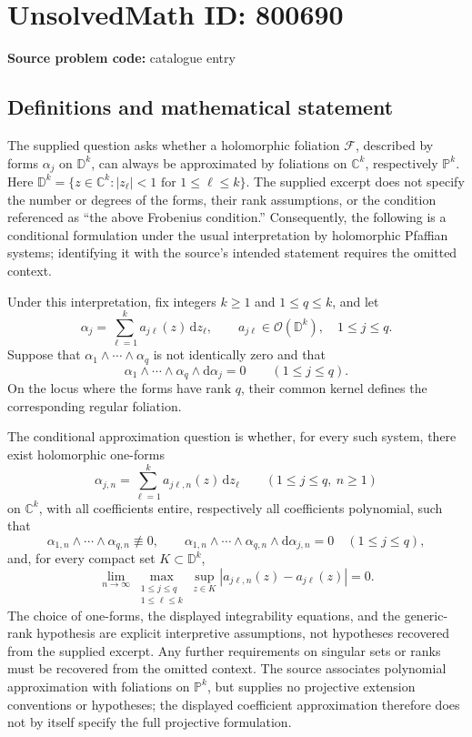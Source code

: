 \documentclass[11pt]{article}
\newcommand{\C}{\mathbb{C}}
\newcommand{\PP}{\mathbb{P}}
\begin{document}
\section*{UnsolvedMath ID: 800690}
\textbf{Source problem code:} catalogue entry
\subsection{Definitions and mathematical statement}
The supplied question asks whether a holomorphic foliation \(\mathscr{F}\), described by forms \(\alpha_j\) on \(\mathbb{D}^k\), can always be approximated by foliations on \(\C^k\), respectively \(\PP^k\). Here \(\mathbb{D}^k=\{z\in\C^k:|z_\ell|<1\text{ for }1\leq\ell\leq k\}\). The supplied excerpt does not specify the number or degrees of the forms, their rank assumptions, or the condition referenced as ``the above Frobenius condition.'' Consequently, the following is a conditional formulation under the usual interpretation by holomorphic Pfaffian systems; identifying it with the source's intended statement requires the omitted context.

Under this interpretation, fix integers \(k\geq1\) and \(1\leq q\leq k\), and let
\[
\alpha_j=\sum_{\ell=1}^k a_{j\ell}(z)\,\mathrm{d}z_\ell,
\qquad a_{j\ell}\in\mathcal{O}(\mathbb{D}^k),\quad 1\leq j\leq q.
\]
Suppose that \(\alpha_1\wedge\cdots\wedge\alpha_q\) is not identically zero and that
\[
\alpha_1\wedge\cdots\wedge\alpha_q\wedge\mathrm{d}\alpha_j=0
\qquad(1\leq j\leq q).
\]
On the locus where the forms have rank \(q\), their common kernel defines the corresponding regular foliation.

The conditional approximation question is whether, for every such system, there exist holomorphic one-forms
\[
\alpha_{j,n}=\sum_{\ell=1}^k a_{j\ell,n}(z)\,\mathrm{d}z_\ell
\qquad(1\leq j\leq q,\ n\geq1)
\]
on \(\C^k\), with all coefficients entire, respectively all coefficients polynomial, such that
\[
\alpha_{1,n}\wedge\cdots\wedge\alpha_{q,n}\not\equiv0,
\qquad
\alpha_{1,n}\wedge\cdots\wedge\alpha_{q,n}\wedge\mathrm{d}\alpha_{j,n}=0
\quad(1\leq j\leq q),
\]
and, for every compact set \(K\subset\mathbb{D}^k\),
\[
\lim_{n\to\infty}\max_{\substack{1\leq j\leq q\\1\leq\ell\leq k}}
\sup_{z\in K}|a_{j\ell,n}(z)-a_{j\ell}(z)|=0.
\]
The choice of one-forms, the displayed integrability equations, and the generic-rank hypothesis are explicit interpretive assumptions, not hypotheses recovered from the supplied excerpt. Any further requirements on singular sets or ranks must be recovered from the omitted context. The source associates polynomial approximation with foliations on \(\PP^k\), but supplies no projective extension conventions or hypotheses; the displayed coefficient approximation therefore does not by itself specify the full projective formulation.
\end{document}

